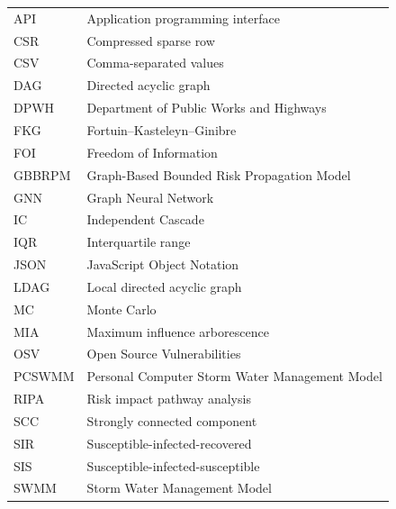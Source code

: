 \thispagestyle{prelim}
\vspace{3\baselineskip}
\noindent\begingroup
\renewcommand{\arraystretch}{1.25}
\begin{tabular}{@{}p{4.0cm}@{}p{10.5cm}@{}}
API & Application programming interface \\
CSR & Compressed sparse row \\
CSV & Comma-separated values \\
DAG & Directed acyclic graph \\
DPWH & Department of Public Works and Highways \\
FKG & Fortuin--Kasteleyn--Ginibre \\
FOI & Freedom of Information \\
GBBRPM & Graph-Based Bounded Risk Propagation Model \\
GNN & Graph Neural Network \\
IC & Independent Cascade \\
IQR & Interquartile range \\
JSON & JavaScript Object Notation \\
LDAG & Local directed acyclic graph \\
MC & Monte Carlo \\
MIA & Maximum influence arborescence \\
OSV & Open Source Vulnerabilities \\
PCSWMM & Personal Computer Storm Water Management Model \\
RIPA & Risk impact pathway analysis \\
SCC & Strongly connected component \\
SIR & Susceptible-infected-recovered \\
SIS & Susceptible-infected-susceptible \\
SWMM & Storm Water Management Model \\
\end{tabular}\endgroup
